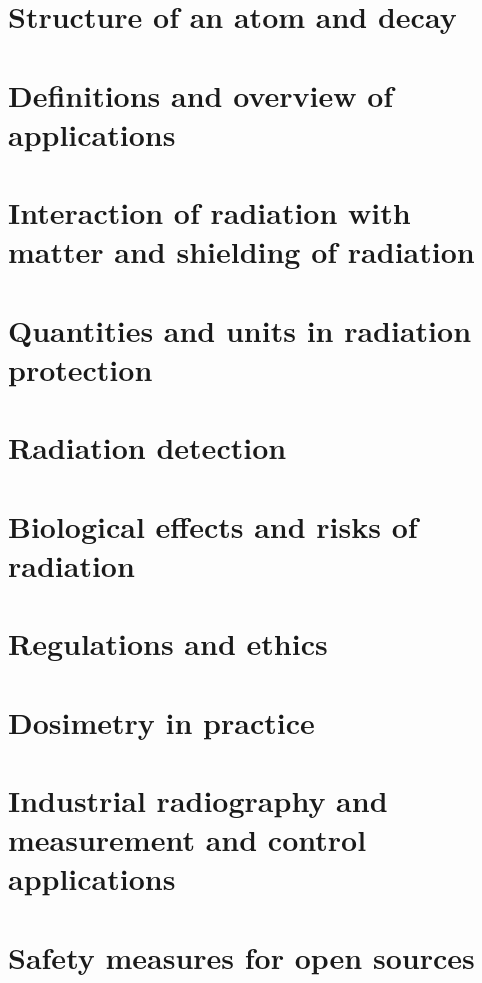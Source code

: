 \documentclass{report}
\begin{document}
\chapter{Structure of an atom and decay}
\chapter{Definitions and overview of applications}
\chapter{Interaction of radiation with matter and shielding of radiation}
\chapter{Quantities and units in radiation protection}
\chapter{Radiation detection}
\chapter{Biological effects and risks of radiation}
\chapter{Regulations and ethics}
\chapter{Dosimetry in practice}
\chapter{Industrial radiography and measurement and control applications}
\chapter{Safety measures for open sources}
\end{document}
